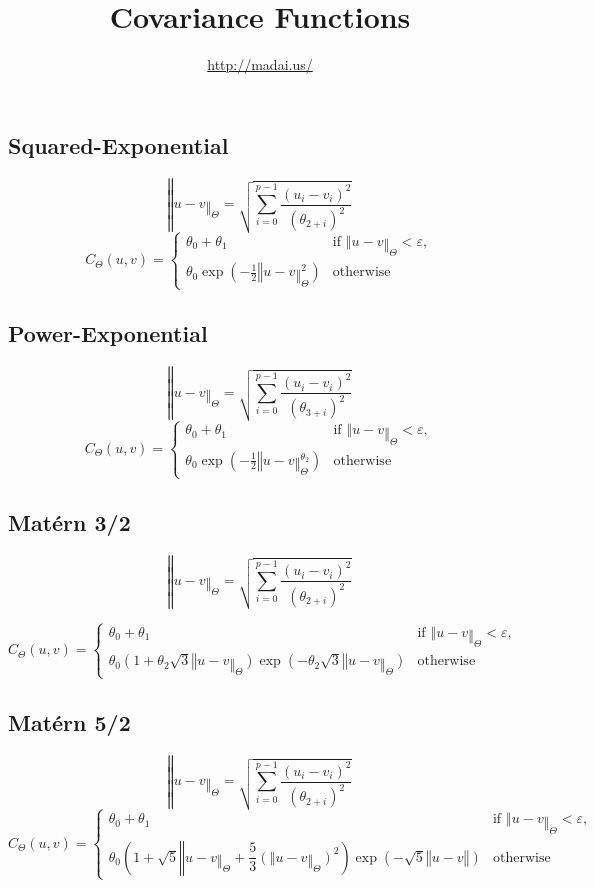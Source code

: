 \documentclass{article}
\title{Covariance Functions}
\author{\url{http://madai.us/}}
\begin{document}
\maketitle


\subsection*{Squared-Exponential}

\[ ‖u-v‖_Θ = \sqrt{\sum_{i=0}^{p-1} \frac{(u_i - v_i)^2}{(θ_{2+i})^2}} \]
\[
C_Θ(u, v) = \left\{
\begin{array}{cl}
θ_0 + θ_1 & \text{if } ‖u-v‖_Θ < ε,\\
θ_0 \exp\left({-\frac{1}{2} ‖u-v‖_Θ^2}\right)
 & \text{otherwise}
\end{array} \right.
\]

\subsection*{Power-Exponential}

\[ ‖u-v‖_Θ = \sqrt{\sum_{i=0}^{p-1} \frac{(u_i - v_i)^2}{(θ_{3+i})^2}} \]
\[
C_Θ(u, v) = \left\{
\begin{array}{cl}
θ_0 + θ_1 & \text{if } ‖u-v‖_Θ < ε,\\
θ_0 \exp\left({-\frac{1}{2} ‖u-v‖_Θ^{θ_2}}\right)
 & \text{otherwise}
\end{array} \right.
\]

\subsection*{Matérn 3/2}
\[ ‖u-v‖_Θ = \sqrt{\sum_{i=0}^{p-1} \frac{(u_i - v_i)^2}{(θ_{2+i})^2}} \]

\[
C_Θ(u, v) = \left\{
\begin{array}{cl}
θ_0 + θ_1 & \text{if } ‖u-v‖_Θ < ε,\\
{θ_0} \left({ 1 + θ_2 \sqrt{3} ‖u-v‖_Θ }\right)
\exp \left({ - θ_2 \sqrt{3} ‖u-v‖_Θ }\right)
 & \text{otherwise}
\end{array} \right.
\]


\subsection*{Matérn 5/2}
\[ ‖u-v‖_Θ = \sqrt{\sum_{i=0}^{p-1} \frac{(u_i - v_i)^2}{(θ_{2+i})^2}} \]
\[
C_Θ(u, v) = \left\{
\begin{array}{cl}
θ_0 + θ_1 & \text{if } ‖u-v‖_Θ < ε,\\
{θ_0} \left({ 1 + \sqrt{5} ‖u-v‖_Θ
 + \dfrac{5}{3} \left({‖u-v‖_Θ}\right)^2  }\right)
\exp \left({ - \sqrt{5} ‖u-v‖ }\right)
 & \text{otherwise}
\end{array} \right.
\]
\end{document}
